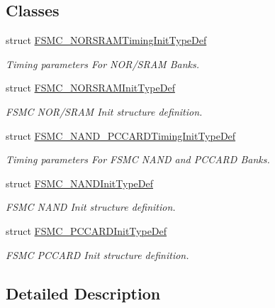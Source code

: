 \subsection*{Classes}
\begin{DoxyCompactItemize}
\item 
struct \hyperlink{struct_f_s_m_c___n_o_r_s_r_a_m_timing_init_type_def}{F\+S\+M\+C\+\_\+\+N\+O\+R\+S\+R\+A\+M\+Timing\+Init\+Type\+Def}
\begin{DoxyCompactList}\small\item\em Timing parameters For N\+O\+R/\+S\+R\+AM Banks. \end{DoxyCompactList}\item 
struct \hyperlink{struct_f_s_m_c___n_o_r_s_r_a_m_init_type_def}{F\+S\+M\+C\+\_\+\+N\+O\+R\+S\+R\+A\+M\+Init\+Type\+Def}
\begin{DoxyCompactList}\small\item\em F\+S\+MC N\+O\+R/\+S\+R\+AM Init structure definition. \end{DoxyCompactList}\item 
struct \hyperlink{struct_f_s_m_c___n_a_n_d___p_c_c_a_r_d_timing_init_type_def}{F\+S\+M\+C\+\_\+\+N\+A\+N\+D\+\_\+\+P\+C\+C\+A\+R\+D\+Timing\+Init\+Type\+Def}
\begin{DoxyCompactList}\small\item\em Timing parameters For F\+S\+MC N\+A\+ND and P\+C\+C\+A\+RD Banks. \end{DoxyCompactList}\item 
struct \hyperlink{struct_f_s_m_c___n_a_n_d_init_type_def}{F\+S\+M\+C\+\_\+\+N\+A\+N\+D\+Init\+Type\+Def}
\begin{DoxyCompactList}\small\item\em F\+S\+MC N\+A\+ND Init structure definition. \end{DoxyCompactList}\item 
struct \hyperlink{struct_f_s_m_c___p_c_c_a_r_d_init_type_def}{F\+S\+M\+C\+\_\+\+P\+C\+C\+A\+R\+D\+Init\+Type\+Def}
\begin{DoxyCompactList}\small\item\em F\+S\+MC P\+C\+C\+A\+RD Init structure definition. \end{DoxyCompactList}\end{DoxyCompactItemize}


\subsection{Detailed Description}
